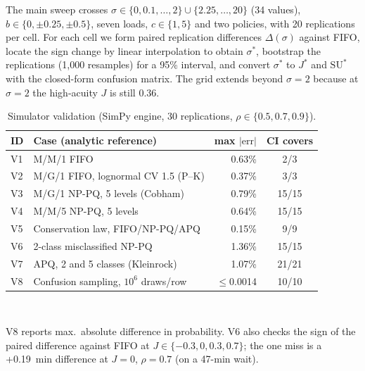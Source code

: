 \documentclass[conference]{IEEEtran}
\begin{document}
The main sweep crosses $\sigma\in\{0,0.1,\dots,2\}\cup\{2.25,\dots,20\}$ (34 values),
$b\in\{0,\pm0.25,\pm0.5\}$, seven loads, $c\in\{1,5\}$ and two policies, with 20
replications per cell. For each cell we form paired replication differences
$\Delta(\sigma)$ against FIFO, locate the sign change by linear interpolation to obtain
$\sigma^*$, bootstrap the replications (1,000 resamples) for a 95\% interval, and convert
$\sigma^*$ to $J^*$ and $\mathrm{SU}^*$ with the closed-form confusion matrix. The grid
extends beyond $\sigma=2$ because at $\sigma=2$ the high-acuity $J$ is still 0.36.

\begin{table}[t]
\caption{Simulator validation (SimPy engine, 30 replications, $\rho\in\{0.5,0.7,0.9\}$).}
\label{tab:val}
\centering\footnotesize
\begin{tabular}{@{}llrc@{}}
\toprule
ID & Case (analytic reference) & max $|\text{err}|$ & CI covers \\
\midrule
V1 & M/M/1 FIFO & 0.63\% & 2/3 \\
V2 & M/G/1 FIFO, lognormal CV 1.5 (P--K) & 0.37\% & 3/3 \\
V3 & M/G/1 NP-PQ, 5 levels (Cobham) & 0.79\% & 15/15 \\
V4 & M/M/5 NP-PQ, 5 levels & 0.64\% & 15/15 \\
V5 & Conservation law, FIFO/NP-PQ/APQ & 0.15\% & 9/9 \\
V6 & 2-class misclassified NP-PQ & 1.36\% & 15/15 \\
V7 & APQ, 2 and 5 classes (Kleinrock) & 1.07\% & 21/21 \\
V8 & Confusion sampling, $10^6$ draws/row & $\le$0.0014 & 10/10 \\
\bottomrule
\end{tabular}
\\[2pt]\raggedright\scriptsize V8 reports max.\ absolute difference in probability.
V6 also checks the sign of the paired difference against FIFO at $J\in\{-0.3,0,0.3,0.7\}$;
the one miss is a +0.19~min difference at $J=0$, $\rho=0.7$ (on a 47-min wait).
\end{table}
\end{document}
